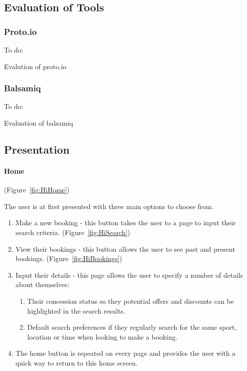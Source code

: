 
\subsection{Evaluation of Tools}

\subsubsection{Proto.io}

To do:

Evalution of proto.io

\subsubsection{Balsamiq}

To do:

Evaluation of balsamiq

\subsection{Presentation}

\paragraph{Home} (Figure~\ref{fig:HiHome})


The user is at first presented with three main options to choose from.
\begin{enumerate}
	\item Make a new booking - this button takes the user to a page to input
		  their search criteria. (Figure~\ref{fig:HiSearch})
	\item View their bookings - this button allows the user to see past and
		  present bookings. (Figure~\ref{fig:HiBookings})
	\item Input their details - this page allows the user to specify a number
		  of details about themselves:

		  \begin{enumerate}
			\item Their concession status so they potential offers and discounts can
				  be highlighted in the search results.
			\item Default search preferences if they regularly search for the same sport,
				  location or time when looking to make a booking.
		  \end{enumerate}
	\item The home button is repeated on every page and provides the user with
		  a quick way to return to this home screen.
\end{enumerate}

